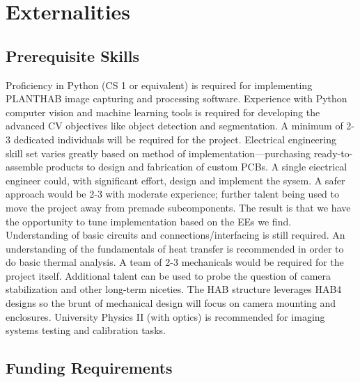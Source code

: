 \documentclass[conference]{IEEEtran} %
\begin{document}
\section{Externalities}
\subsection{Prerequisite Skills}
Proficiency in Python (CS 1 or equivalent) is required for implementing PLANTHAB image capturing and processing software. 
Experience with Python computer vision and machine learning tools is required for developing the advanced CV objectives like object detection and segmentation. A minimum of 2-3 dedicated individuals will be required for the project.
Electrical engineering skill set varies greatly based on method of implementation---purchasing ready-to-assemble products to design and fabrication of custom PCBs. A single eiectrical engineer could, with significant effort, design and implement the sysem. A safer approach would be 2-3 with moderate experience; further talent being used to move the project away from premade subcomponents.
The result is that we have the opportunity to tune implementation based on the EEs we find. 
Understanding of basic circuits and connections/interfacing is still required. 
An understanding of the fundamentals of heat transfer is recommended in order to do basic thermal analysis. A team of 2-3 mechanicals would be required for the project itself. Additional talent can be used to probe the question of camera stabilization and other long-term niceties. 
The HAB structure leverages HAB4 designs so the brunt of mechanical design will focus on camera mounting and enclosures. 
University Physics II (with optics) is recommended for imaging systems testing and calibration tasks.

\subsection{Funding Requirements}
\label{funding}

\end{document}
